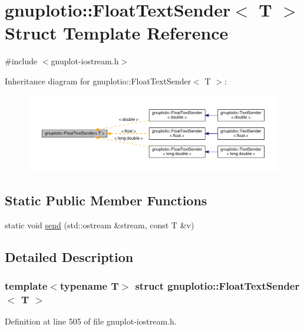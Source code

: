 \hypertarget{structgnuplotio_1_1_float_text_sender}{}\section{gnuplotio\+:\+:Float\+Text\+Sender$<$ T $>$ Struct Template Reference}
\label{structgnuplotio_1_1_float_text_sender}


{\ttfamily \#include $<$gnuplot-\/iostream.\+h$>$}



Inheritance diagram for gnuplotio\+:\+:Float\+Text\+Sender$<$ T $>$\+:
\nopagebreak
\begin{figure}[H]
\begin{center}
\leavevmode
\includegraphics[width=350pt]{structgnuplotio_1_1_float_text_sender__inherit__graph}
\end{center}
\end{figure}
\subsection*{Static Public Member Functions}
\begin{DoxyCompactItemize}
\item 
static void \hyperlink{structgnuplotio_1_1_float_text_sender_aed6b6c3a95b1396688800d6d1f2fc299}{send} (std\+::ostream \&stream, const T \&v)
\end{DoxyCompactItemize}


\subsection{Detailed Description}
\subsubsection*{template$<$typename T$>$\newline
struct gnuplotio\+::\+Float\+Text\+Sender$<$ T $>$}



Definition at line 505 of file gnuplot-\/iostream.\+h.



